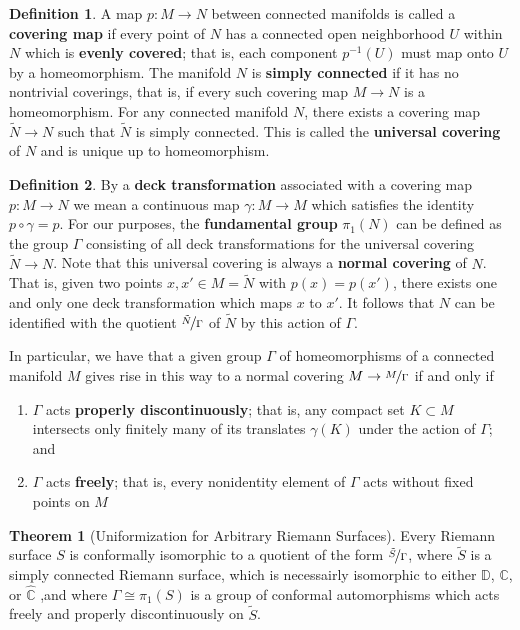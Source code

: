 \documentclass{article}
\theoremstyle{definition}
\newtheorem{theorem}{Theorem}
\newtheorem{defn}{Definition}
\begin{document}
    \begin{defn}
        A map $p:M\to N$ between connected manifolds is called a \textbf{covering map} if every point of $N$ has a connected
        open neighborhood $U$ within $N$ which is \textbf{evenly covered}; that is, each component $p^{-1}(U)$ must map onto
        $U$ by a homeomorphism. The manifold $N$ is \textbf{simply connected} if it has no nontrivial coverings, that is,
        if every such covering map $M\to N$ is a homeomorphism. For any connected manifold $N$, there exists a covering map
        $\tilde{N}\to N$ such that $\tilde{N}$ is simply connected. This is called the \textbf{universal covering} of $N$
        and is unique up to homeomorphism.
    \end{defn}

    \begin{defn}
        By a \textbf{deck transformation} associated with a covering map $p: M\to N$ we mean a continuous map $\gamma: M\to M$ which
        satisfies the identity $p\circ\gamma = p$. For our purposes, the \textbf{fundamental group} $\pi_1(N)$ can be defined as
        the group $\Gamma$ consisting of all deck transformations for the universal covering $\tilde{N}\to N$. Note that this
        universal covering is always a \textbf{normal covering} of $N$. That is, given two points $x,x'\in M=\tilde{N}$ with
        $p(x)=p(x')$, there exists one and only one deck transformation which maps $x$ to $x'$. It follows that $N$ can be identified
        with the quotient $\nicefrac{\tilde{N}}{\Gamma}$ of $\tilde{N}$ by this action of $\Gamma$.
    \end{defn}

    In particular, we have that a given group $\Gamma$ of homeomorphisms of a connected manifold $M$ gives rise in this way
    to a normal covering $M\to \nicefrac{M}{\Gamma}$ if and only if
    \begin{enumerate}
        \item $\Gamma$ acts \textbf{properly discontinuously}; that is, any compact set $K\subset M$ intersects only finitely
            many of its translates $\gamma(K)$ under the action of $\Gamma$; and
        \item $\Gamma$ acts \textbf{freely}; that is, every nonidentity element of $\Gamma$ acts without fixed points on $M$
    \end{enumerate}

    \begin{theorem}[Uniformization for Arbitrary Riemann Surfaces]
        Every Riemann surface $S$ is conformally isomorphic to a quotient of the form $\nicefrac{\tilde{S}}{\Gamma}$, where
        $\tilde{S}$ is a simply connected Riemann surface, which is necessairly isomorphic to either $\mathbb{D}$, $\mathbb{C}$,
        or $\hat{\mathbb{C}}$ ,and where $\Gamma\cong\pi_1(S)$ is a group of conformal automorphisms which acts freely and properly
        discontinuously on $\tilde{S}$.
    \end{theorem}
\end{document}

